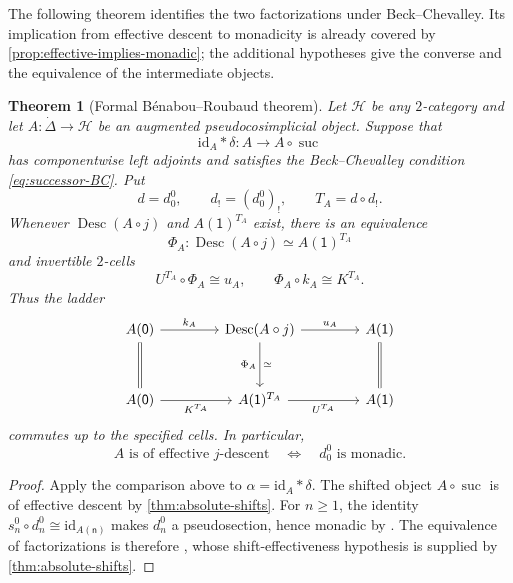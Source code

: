 \documentclass[11pt,a4paper]{article}
\numberwithin{equation}{section}
\newtheorem{theorem}{Theorem}[section]
\theoremstyle{definition}
\theoremstyle{remark}
\newcommand{\id}{\mathrm{id}}
\newcommand{\Hcat}{\mathcal H}
\newcommand{\Desc}{\operatorname{Desc}}
\newcommand{\suc}{\operatorname{suc}}
\begin{document}
The following theorem identifies the two factorizations under
Beck--Chevalley. Its implication from effective descent to
monadicity is already covered by
\cref{prop:effective-implies-monadic}; the additional hypotheses
give the converse and the equivalence of the intermediate objects.

\begin{theorem}[Formal B\'enabou--Roubaud theorem]
\label{thm:formal-BR}
Let $\Hcat$ be any $2$-category and let
$A\colon\dot\Delta\to\Hcat$ be an augmented pseudocosimplicial
object. Suppose that
\[
  \id_A\ast\delta\colon A\longrightarrow A\circ\suc
\]
has componentwise left adjoints and satisfies the
Beck--Chevalley condition \eqref{eq:successor-BC}. Put
\[
  d=d_0^0,
  \qquad
  d_!=(d_0^0)_!,
  \qquad
  T_A=d\circ d_!.
\]
Whenever $\Desc(A\circ j)$ and $A(\mathsf 1)^{T_A}$ exist, there is an equivalence
\begin{equation}
  \Phi_A\colon\Desc(A\circ j)\simeq A(\mathsf 1)^{T_A}
  \label{eq:formal-BR-equivalence}
\end{equation}
and invertible $2$-cells
\begin{equation}
  U^{T_A}\circ\Phi_A\cong u_A,
  \qquad
  \Phi_A\circ k_A\cong K^{T_A}.
  \label{eq:formal-BR-compatibility}
\end{equation}
Thus the ladder
\begin{equation}
\begin{tikzcd}[column sep=4.2em,row sep=3.2em]
  A(\mathsf 0) \ar[r,"k_A"] \ar[d,equal]
  & \Desc(A\circ j) \ar[r,"u_A"] \ar[d,"\Phi_A"',"\simeq"]
  & A(\mathsf 1) \ar[d,equal]
  \\
  A(\mathsf 0) \ar[r,"K^{T_A}"']
  & A(\mathsf 1)^{T_A} \ar[r,"U^{T_A}"']
  & A(\mathsf 1)
\end{tikzcd}
\label{eq:BR-ladder}
\end{equation}
commutes up to the specified cells. In particular,
\[
  A\text{ is of effective }j\text{-descent}
  \quad\Longleftrightarrow\quad
  d_0^0\text{ is monadic}.
\]
\end{theorem}

\begin{proof}
Apply the comparison above to $\alpha=\id_A\ast\delta$.
The shifted object $A\circ\suc$ is of effective descent by
\cref{thm:absolute-shifts}. For $n\geq1$, the identity
$s_n^0\circ d_n^0\cong\id_{A(\mathsf n)}$ makes $d_n^0$ a
pseudosection, hence monadic by \cite[Lemma~8.4]{Nunes2018}.
The equivalence of factorizations is therefore
\cite[Theorem~8.5]{Nunes2018}, whose shift-effectiveness hypothesis
is supplied by \cref{thm:absolute-shifts}.
\end{proof}
\end{document}
